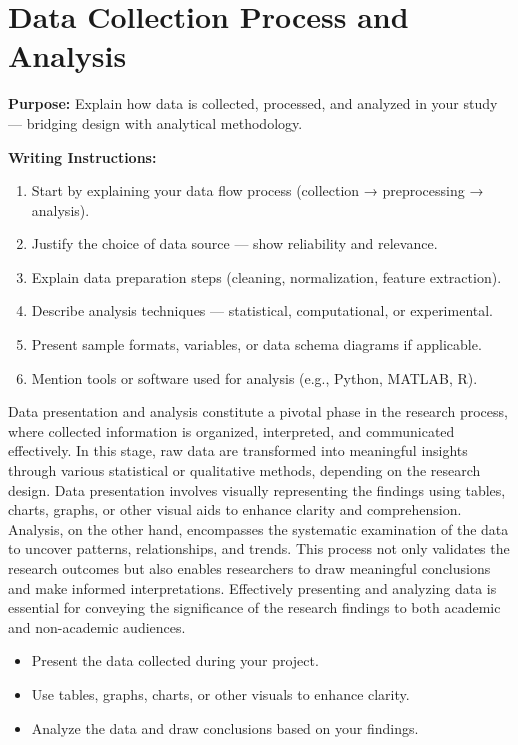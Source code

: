 \section{Data Collection Process and Analysis}

{\color{blue}\textbf{Purpose:}
Explain how data is collected, processed, and analyzed in your study — bridging design with analytical methodology.} \\

{\color{red}\textbf{Writing Instructions:}
\begin{enumerate}
    \item Start by explaining your data flow process (collection → preprocessing → analysis).
    
    \item Justify the choice of data source — show reliability and relevance.
    
    \item Explain data preparation steps (cleaning, normalization, feature extraction).
    
    \item Describe analysis techniques — statistical, computational, or experimental.
    
    \item Present sample formats, variables, or data schema diagrams if applicable.
    
    \item Mention tools or software used for analysis (e.g., Python, MATLAB, R).
\end{enumerate}


Data presentation and analysis constitute a pivotal phase in the research process, where collected information is organized, interpreted, and communicated effectively. In this stage, raw data are transformed into meaningful insights through various statistical or qualitative methods, depending on the research design. Data presentation involves visually representing the findings using tables, charts, graphs, or other visual aids to enhance clarity and comprehension. Analysis, on the other hand, encompasses the systematic examination of the data to uncover patterns, relationships, and trends. This process not only validates the research outcomes but also enables researchers to draw meaningful conclusions and make informed interpretations. Effectively presenting and analyzing data is essential for conveying the significance of the research findings to both academic and non-academic audiences. 

\begin{itemize}
    \item Present the data collected during your project.
    \item Use tables, graphs, charts, or other visuals to enhance clarity.
    \item Analyze the data and draw conclusions based on your findings.
\end{itemize} }




